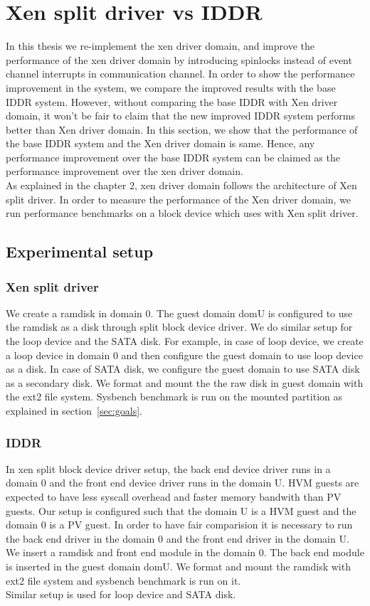 \section{Xen split driver vs IDDR}
In this thesis we re-implement the xen driver domain, and improve the performance of the xen driver domain by introducing spinlocks instead of event channel interrupts in communication channel. In order to show the performance improvement in the system, we compare the improved results with the base IDDR system. However, without comparing the base IDDR with Xen driver domain, it won't be fair to claim that the new improved IDDR system performs better than Xen driver domain. In this section, we show that the performance of the base IDDR system and the Xen driver domain is same. Hence, any performance improvement over the base IDDR system can be claimed as the performance improvement over the xen driver domain.
\\[3mm]
As explained in the chapter 2, xen driver domain follows the architecture of Xen split driver. In order to measure the performance of the Xen driver domain, we run performance benchmarks on a block device which uses with Xen split driver.

\subsection{Experimental setup}

\subsubsection*{Xen split driver}
We create a ramdisk in domain 0. The guest domain domU is configured to use the ramdisk as a disk through split block device driver. We do similar setup for the loop device and the SATA disk. For example, in case of loop device, we create a loop device in domain 0 and then configure the guest domain to use loop device as a disk. In case of SATA disk, we configure the guest domain to use SATA disk as a secondary disk. We format and mount the the raw disk in guest domain with the ext2 file system. Sysbench benchmark is run on the mounted partition as explained in section~\ref{sec:goals}.

\subsubsection*{IDDR}
In xen split block device driver setup, the back end device driver runs in a domain 0 and the front end device driver runs in the domain U. HVM guests are expected to have less syscall overhead and faster memory bandwith than PV guests. Our setup is configured such that the domain U is a HVM guest and the domain 0 is a PV guest. In order to have fair comparision it is necessary to run the back end driver in the domain 0 and the front end driver in the domain U.
\\[3mm]
We insert a ramdisk and front end module in the domain 0. The back end module is inserted in the guest domain domU. We format and mount the ramdisk with ext2 file system and sysbench benchmark is run on it.  
\\[3mm]
Similar setup is used for loop device and SATA disk.
